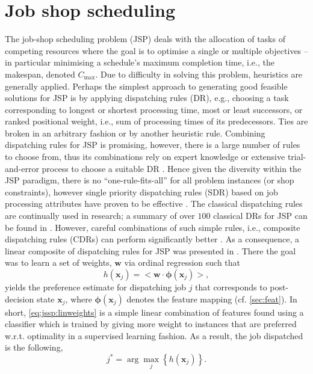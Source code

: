 \documentclass[graybox]{svmult}
\renewcommand{\vec}[1]{\mathbf{#1}}
\newcommand{\vphi}{{\boldsymbol{\phi}}}
\newcommand{\inner}[2]{\big<{#1}\cdot{#2}\big>}
\begin{document}
\section{Job shop scheduling}
The job-shop scheduling problem (JSP) deals with the allocation of tasks of 
competing resources where the goal is to optimise a single or multiple 
objectives -- in particular minimising a schedule's maximum completion time, 
i.e., the makespan, denoted $C_{\max}$. Due to difficulty in solving this 
problem, heuristics are generally applied. Perhaps the simplest approach to 
generating good feasible solutions for JSP is by applying dispatching rules 
(DR),  e.g., choosing a task corresponding to longest or shortest processing 
time, most or least successors, or ranked positional weight, i.e., sum of 
processing times of its predecessors. Ties are broken in an arbitrary fashion 
or by another heuristic rule. Combining dispatching rules for JSP is promising, 
however, there is a large number of rules to choose from, thus its combinations 
rely on expert knowledge or extensive trial-and-error process to choose a 
suitable DR \cite{Tay08}. Hence given the diversity within the JSP paradigm, 
there is no ``one-rule-fits-all'' for all problem instances (or shop 
constraints), however single priority dispatching rules (SDR) based on job 
processing attributes have proven to be effective \cite{Haupt89}. 
The classical dispatching rules are continually used in research; a summary of 
over $100$ classical DRs for JSP can be found in \cite{Panwalkar77}. 
However, careful combinations of such simple rules, i.e., composite dispatching 
rules (CDRs) can perform significantly better \cite{Jayamohan04}. 
As a consequence, a linear composite of dispatching rules for JSP was presented 
in \cite{InRu11a}. There the goal was to learn a set of weights, $\vec{w}$ via 
ordinal regression such that 
\begin{equation}\label{eq:jssp:linweights}
h(\vec{x}_j)= \inner{\vec{w}}{\vphi(\vec{x}_j)},
\end{equation}
yields the preference estimate for dispatching job $j$ that corresponds to 
post-decision state $\vec{x}_j$, where $\vphi(\vec{x}_j)$ denotes the feature 
mapping (cf. \cref{sec:feat}). 
In short, \cref{eq:jssp:linweights} is a simple linear combination of features 
found using a classifier which is trained by giving more weight to instances 
that are preferred w.r.t. optimality in a supervised learning fashion. As a 
result, the job dispatched is the following, 
\begin{equation}\label{eq:jstar}
j^* = \arg\max_j\left\{h(\vec{x}_j)\right\}. 
\end{equation}
\end{document}
